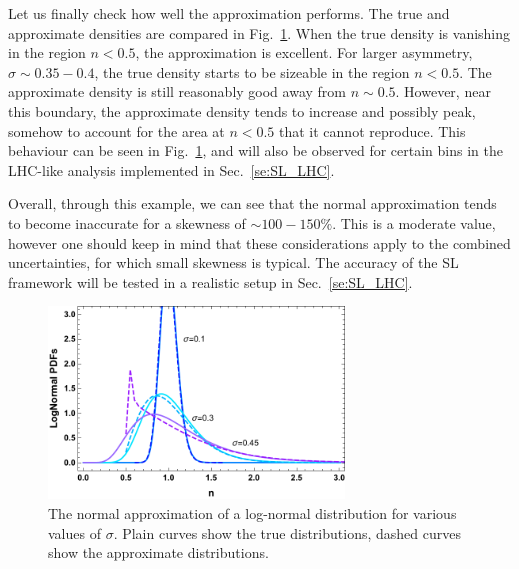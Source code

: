 \documentclass[11pt]{article}
\begin{document}
 Let us finally check how well the approximation performs. The true and approximate densities are compared in Fig.~\ref{fig:approxs}.   When the true density is vanishing in the region $n<0.5$, the approximation is excellent.  For larger asymmetry, $\sigma \sim 0.35-0.4$, the true density starts to be sizeable in the region $n<0.5$. The approximate density is still reasonably good away from $n\sim 0.5$. However, near this boundary, the approximate density tends to increase and possibly peak, somehow to account for  the area at $n<0.5$ that it cannot reproduce.
 This behaviour can be seen in Fig.~\ref{fig:approxs}, and will also be observed for certain bins in the LHC-like analysis implemented in Sec.~\ref{se:SL_LHC}.

   Overall, through this example, we can see that the normal approximation tends to become inaccurate for a skewness of $\sim 100-150\%$. This is a moderate value, however one should keep in mind that these considerations apply to the combined uncertainties, for which small skewness is typical. The accuracy of the SL framework will be tested in a realistic setup in Sec.~\ref{se:SL_LHC}.






\begin{figure}[t]
\begin{center}
\includegraphics[width=0.7\textwidth]{figures/PlotLogNormal.pdf}
\end{center}
\caption{\label{fig:approxs}
The normal approximation of a log-normal distribution for various values of $\sigma$. Plain curves show the true distributions, dashed curves show the approximate distributions. 
}
\end{figure}
\end{document}
